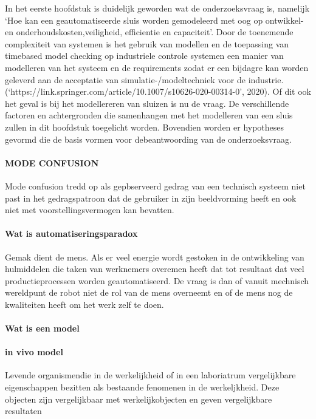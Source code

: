 
 




In het eerste hoofdstuk is duidelijk geworden wat de onderzoeksvraag is, namelijk ‘Hoe kan een geautomatiseerde sluis worden gemodeleerd met oog op ontwikkel- en onderhoudskosten,veiligheid, efficientie en capaciteit’. Door de toenemende complexiteit van systemen is het gebruik van modellen en de toepassing van timebased model checking  op industriele controle systemen een manier van modelleren van het systeem en de requirements zodat er een bijdagre kan worden geleverd aan de acceptatie van  simulatie-/modeltechniek voor de industrie.(‘https://link.springer.com/article/10.1007/s10626-020-00314-0’, 2020). Of dit ook het geval is bij het modellereren van sluizen is nu de vraag.
De verschillende factoren en achtergronden die  samenhangen met het modelleren van een sluis zullen in dit hoofdstuk toegelicht worden. Bovendien worden er hypotheses gevormd die de basis vormen voor debeantwoording van de onderzoeksvraag. 




\paragraph{MODE CONFUSION }
Mode confusion tredd op als gepbserveerd gedrag van een technisch systeem niet past in het gedragspatroon dat de gebruiker in zijn beeldvorming heeft  en ook niet met voorstellingsvermogen kan bevatten.
\paragraph{Wat is automatiseringsparadox}
Gemak dient de mens. Als er veel energie wordt gestoken in de ontwikkeling van hulmiddelen die taken van werknemers overemen heeft dat tot resultaat dat veel productieprocessen worden geautomatiseerd. De vraag is dan of vanuit mechnisch wereldpunt de robot niet de rol van de mens overneemt en of de mens nog de kwaliteiten heeft om het werk zelf te doen.
\cite{bicker21102016automatiseringsparadox }
\cite{vseautoparadox }
\cite{blogxot21112016slimapparaat }


\paragraph{Wat is een model}

\paragraph{in vivo model}
Levende organismendie in de werkelijkheid of in een laboriatrum vergelijkbare eigenschappen bezitten als bestaande fenomenen in de werkeljkheid. Deze objecten zijn vergelijkbaar met werkelijkobjecten en geven vergelijkbare resultaten
